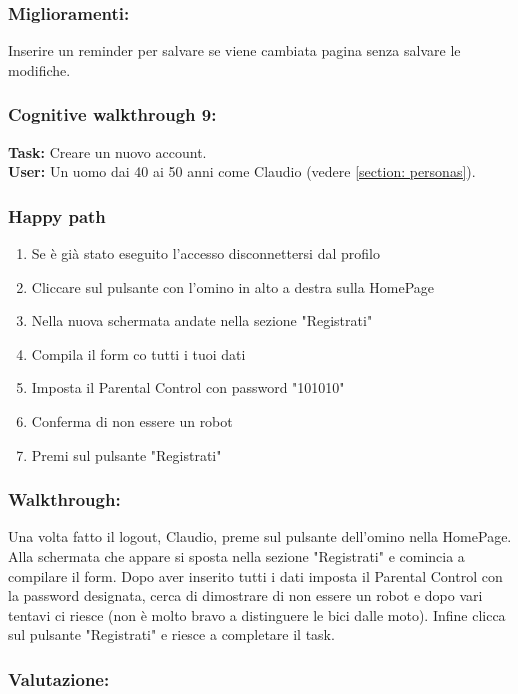 \documentclass[../Report.tex]{subfiles}
\begin{document}
    \subsubsection{Miglioramenti:}
    Inserire un reminder per salvare se viene cambiata pagina senza salvare le modifiche.
    \subsubsection{Cognitive walkthrough 9:}
    \textbf{Task:} Creare un nuovo account.\\
    \textbf{User:} Un uomo dai 40 ai 50 anni come Claudio (vedere \ref{section: personas}).\\

    \subsubsection{Happy path}
    \begin{enumerate}
        \item Se è già stato eseguito l'accesso disconnettersi dal profilo
        \item Cliccare sul pulsante con l’omino in alto a destra sulla HomePage
        \item Nella nuova schermata andate nella sezione "Registrati" 
        \item Compila il form co tutti i tuoi dati
        \item Imposta il Parental Control con password "101010"
        \item Conferma di non essere un robot
        \item Premi sul pulsante "Registrati"
    \end{enumerate}

    \subsubsection{Walkthrough:}
    Una volta fatto il logout, Claudio, preme sul pulsante dell'omino nella HomePage.
    Alla schermata che appare si sposta nella sezione "Registrati" e comincia a compilare il form. Dopo aver inserito tutti i dati imposta il Parental Control con la password designata, cerca di dimostrare di non essere un robot e dopo vari tentavi ci riesce (non è molto bravo a distinguere le bici dalle moto). Infine clicca sul pulsante "Registrati" e riesce a completare il task.
    \subsubsection{Valutazione:}
\end{document}
